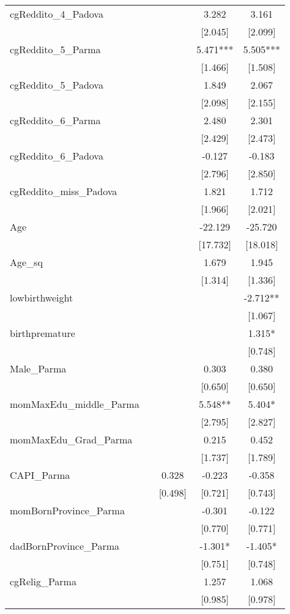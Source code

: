 \documentclass[]{article}
\begin{document}
\begin{tabular}{lcccc}
cgReddito\_4\_Padova &  &  & 3.282 & 3.161 \\
 &  &  & [2.045] & [2.099] \\
cgReddito\_5\_Parma &  &  & 5.471*** & 5.505*** \\
 &  &  & [1.466] & [1.508] \\
cgReddito\_5\_Padova &  &  & 1.849 & 2.067 \\
 &  &  & [2.098] & [2.155] \\
cgReddito\_6\_Parma &  &  & 2.480 & 2.301 \\
 &  &  & [2.429] & [2.473] \\
cgReddito\_6\_Padova &  &  & -0.127 & -0.183 \\
 &  &  & [2.796] & [2.850] \\
cgReddito\_miss\_Padova &  &  & 1.821 & 1.712 \\
 &  &  & [1.966] & [2.021] \\
Age &  &  & -22.129 & -25.720 \\
 &  &  & [17.732] & [18.018] \\
Age\_sq &  &  & 1.679 & 1.945 \\
 &  &  & [1.314] & [1.336] \\
lowbirthweight &  &  &  & -2.712** \\
 &  &  &  & [1.067] \\
birthpremature &  &  &  & 1.315* \\
 &  &  &  & [0.748] \\
Male\_Parma &  &  & 0.303 & 0.380 \\
 &  &  & [0.650] & [0.650] \\
momMaxEdu\_middle\_Parma &  &  & 5.548** & 5.404* \\
 &  &  & [2.795] & [2.827] \\
momMaxEdu\_Grad\_Parma &  &  & 0.215 & 0.452 \\
 &  &  & [1.737] & [1.789] \\
CAPI\_Parma &  & 0.328 & -0.223 & -0.358 \\
 &  & [0.498] & [0.721] & [0.743] \\
momBornProvince\_Parma &  &  & -0.301 & -0.122 \\
 &  &  & [0.770] & [0.771] \\
dadBornProvince\_Parma &  &  & -1.301* & -1.405* \\
 &  &  & [0.751] & [0.748] \\
cgRelig\_Parma &  &  & 1.257 & 1.068 \\
 &  &  & [0.985] & [0.978] \\

\end{tabular}
\end{document}
